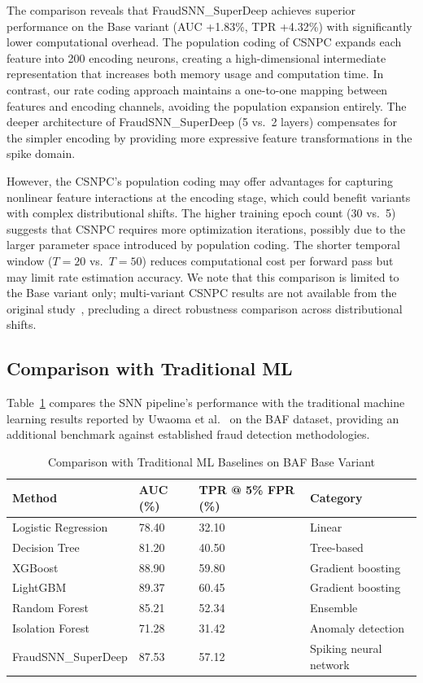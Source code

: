 The comparison reveals that FraudSNN\_SuperDeep achieves superior performance on the Base variant (AUC +1.83\%, TPR +4.32\%) with significantly lower computational overhead. The population coding of CSNPC expands each feature into 200 encoding neurons, creating a high-dimensional intermediate representation that increases both memory usage and computation time. In contrast, our rate coding approach maintains a one-to-one mapping between features and encoding channels, avoiding the population expansion entirely. The deeper architecture of FraudSNN\_SuperDeep (5 vs.\ 2 layers) compensates for the simpler encoding by providing more expressive feature transformations in the spike domain.

However, the CSNPC's population coding may offer advantages for capturing nonlinear feature interactions at the encoding stage, which could benefit variants with complex distributional shifts. The higher training epoch count (30 vs.\ 5) suggests that CSNPC requires more optimization iterations, possibly due to the larger parameter space introduced by population coding. The shorter temporal window ($T = 20$ vs.\ $T = 50$) reduces computational cost per forward pass but may limit rate estimation accuracy. We note that this comparison is limited to the Base variant only; multi-variant CSNPC results are not available from the original study~\cite{farahat2025objective}, precluding a direct robustness comparison across distributional shifts.

\subsection{Comparison with Traditional ML}

Table~\ref{tab:snn-traditional-ml} compares the SNN pipeline's performance with the traditional machine learning results reported by Uwaoma et al.~\cite{feedzai2022baf} on the BAF dataset, providing an additional benchmark against established fraud detection methodologies.

\begin{table}[H]
\centering
\caption{Comparison with Traditional ML Baselines on BAF Base Variant}
\label{tab:snn-traditional-ml}
\small
\begin{tabularx}{0.95\textwidth}{lXXX}
\toprule
\textbf{Method} & \textbf{AUC (\%)} & \textbf{TPR @ 5\% FPR (\%)} & \textbf{Category} \\
\midrule
Logistic Regression & 78.40 & 32.10 & Linear \\
Decision Tree & 81.20 & 40.50 & Tree-based \\
XGBoost & 88.90 & 59.80 & Gradient boosting \\
LightGBM & 89.37 & 60.45 & Gradient boosting \\
Random Forest & 85.21 & 52.34 & Ensemble \\
Isolation Forest & 71.28 & 31.42 & Anomaly detection \\
\midrule
FraudSNN\_SuperDeep & 87.53 & 57.12 & Spiking neural network \\
\bottomrule
\end{tabularx}
\end{table}

